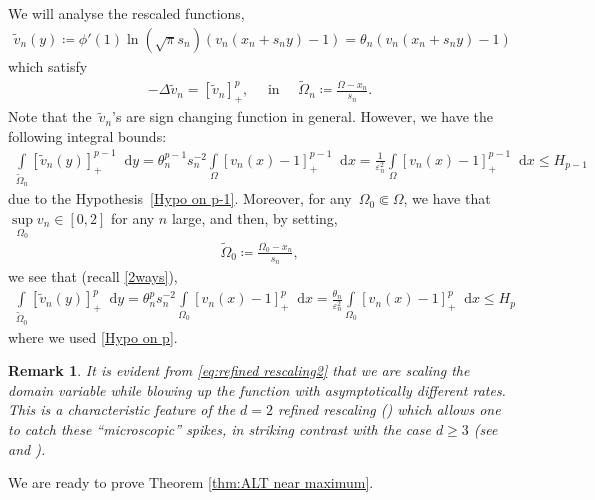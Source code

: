 \documentclass[10pt]{amsart}
\newcommand{\parenthesis}[1]{\left(#1\right)} %
\newcommand{\dd}{\mathop{}\!\mathrm{d}}
\newcommand{\eps}{\varepsilon}
\newtheorem{remark}[theorem]{Remark}
\begin{document}
    We will analyse the rescaled functions,
    \begin{align}\label{eq:refined rescaling2}
        \tilde{v}_n(y)\coloneqq \phi'(1)\ln(\sqrt{\pi}s_n) \parenthesis{ v_n(x_n+ s_n y)-1}
        =\theta_n\parenthesis{ v_n(x_n+ s_n y)-1}
    \end{align}
    which satisfy
    \begin{align*}
        -\Delta \tilde{v}_n=[\tilde{v}_n]_+^p, \quad \mbox{ in }\quad \widetilde{\Omega}_n\coloneqq\frac{\Omega-x_n}{s_n}.
    \end{align*}
    Note that the~$\tilde{v}_n$'s are sign changing function in general. However, we have the following integral bounds:
    \begin{align*}
        \int\limits_{\widetilde{\Omega}_n}[\tilde{v}_n(y)]_+^{p-1}\dd{y}
        =\theta_n^{p-1}s_n^{-2}\int\limits_{\Omega}[v_n(x)-1]_+^{p-1}\dd{x}
        =\frac{1}{\eps_n^2}\int\limits_{\Omega}[v_n(x)-1]_+^{p-1}\dd{x}
        \leq H_{p-1}
    \end{align*}
    due to the Hypothesis~\eqref{Hypo on p-1}.
    Moreover, for any~$\Omega_0\Subset \Omega$, we have that~$\sup\limits_{\Omega_0}v_n \in [0,2]$ for any $n$ large, and then, by setting,
    \begin{align*}
        \widetilde{\Omega}_0\coloneqq\frac{\Omega_0 -x_n}{s_n},
    \end{align*}
    we see that (recall \eqref{2ways}),
    \begin{align*}
        \int\limits_{\widetilde{\Omega}_0} [\tilde{v}_n(y)]_+^p\dd{y}
        = \theta_n^p s_n^{-2} \int\limits_{\Omega_0}[v_n(x)-1]_+^p\dd{x}
        =\frac{\theta_n}{\eps_n^2} \int\limits_{\Omega_0} [v_n(x)-1]_+^p\dd{x}\leq H_p
    \end{align*}
    where we used \eqref{Hypo on p}.

      \begin{remark}\label{rem:spikeresc}
It is evident from \eqref{eq:refined rescaling2} that we are scaling the domain variable while blowing up the function with asymptotically
different rates. This is a characteristic feature of the $d=2$ refined rescaling (\cite{DY}) which allows one to catch these ``microscopic'' spikes, in striking contrast with the case $d\geq 3$ (see \cite{FW,W} and \cite{BJW}).
    \end{remark}

We are ready to prove Theorem \ref{thm:ALT near maximum}.
\end{document}
